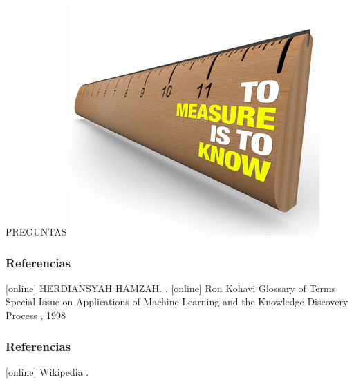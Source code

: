 \documentclass{beamer}
\begin{document}
\begin{frame}

\LARGE{PREGUNTAS}
\includegraphics[scale=0.5]{measure.jpg} 
\end{frame}

\begin{frame}[allowframebreaks]
  \frametitle<presentation>{Referencias}    
  \begin{thebibliography}{10}    
   [online]
     HERDIANSYAH HAMZAH.
    .
  [online]
   Ron Kohavi
    \newblock Glossary of Terms Special Issue on Applications of Machine Learning and the Knowledge Discovery Process
    , 1998
  \end{thebibliography}
\end{frame}

\begin{frame}[allowframebreaks]
  \frametitle<presentation>{Referencias}    
  \begin{thebibliography}{10}    
   [online]
  	Wikipedia
    .
   
  \end{thebibliography}
\end{frame}



\end{document}
